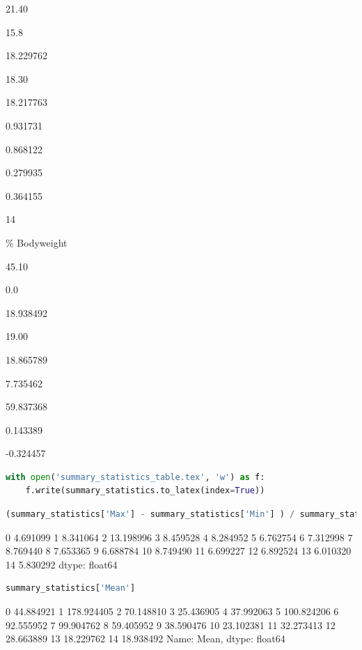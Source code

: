 21.40

15.8

18.229762

18.30

18.217763

0.931731

0.868122

0.279935

0.364155

14

\% Bodyweight

45.10

0.0

18.938492

19.00

18.865789

7.735462

59.837368

0.143389

-0.324457

\begin{lstlisting}[language=Python]
with open('summary_statistics_table.tex', 'w') as f:
    f.write(summary_statistics.to_latex(index=True))
\end{lstlisting}

\begin{lstlisting}[language=Python]
(summary_statistics['Max'] - summary_statistics['Min'] ) / summary_statistics['Standard Deviation']
\end{lstlisting}

0 4.691099 1 8.341064 2 13.198996 3 8.459528 4 8.284952 5 6.762754 6
7.312998 7 8.769440 8 7.653365 9 6.688784 10 8.749490 11 6.699227 12
6.892524 13 6.010320 14 5.830292 dtype: float64

\begin{lstlisting}[language=Python]
summary_statistics['Mean']
\end{lstlisting}

0 44.884921 1 178.924405 2 70.148810 3 25.436905 4 37.992063 5
100.824206 6 92.555952 7 99.904762 8 59.405952 9 38.590476 10 23.102381
11 32.273413 12 28.663889 13 18.229762 14 18.938492 Name: Mean, dtype:
float64

